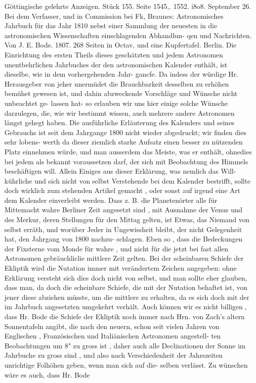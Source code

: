 \documentclass[12pt,a4paper]{article}
\begin{document}
Göttingische  gelehrte  Anzeigen.     Stück  155.     Seite  1545,.  1552.     i8o8.  September  26. Bei  dem  Verfasser,  und  in  Commission  bei  Fk,  Braunes:  Astronomisches  Jahrbuch  für  das  Jahr 1810  nebst  einer  Sammlung  der  neuesten  in  die  astronomischen  Wissenschaften  einschlagenden  Abhandlun- qen  und  Nachrichten.     Von  J.  E.  Bode.  1807.     268  Seiten  in  Octav,  und  eine  Kupfertafel.     Berlin. Die  Einrichtung  des  ersten  Theils  dieses  geschätzten  und  jedem  Astronomen  unentbehrlichen Jahrbuches  der  den  astronomischen  Kalender  enthält,  ist  dieselbe,  wie  in  dem  vorhergehenden  Jahr- gancfe.  Da  indess  der  würdige  Hr.  Herausgeber  von  jeher  unermüdet  die  Brauchbarkeit  desselben  zu erhöhen  bemühet  gewesen  ist,  und  dahin  abzweckende  Vorschläge  und  Wünsche  nicht  unbeachtet  ge- lassen hat-  so  erlauben  wir  uns  hier  einige  solche  Wünsche  darzulegen,  die,  wie  wir  bestimmt  wissen, auch  mehrere  andere  Astronomen  längst  gehegt  haben.  Die  ausführliche  Erläuterung  des  Kalenders und  seines  Gebrauchs  ist  seit  dem  Jahrgange  1800  nicht  wieder  abgedruckt;  wir  finden  dies  sehr  lobens- werth  da  dieser  ziemlich  starke  Aufsatz  einen  besser  zu  nützenden  Platz  einnehmen  würde,  und  man ausserdem  das  Meiste,  was  er  enthält,  ohnedies  bei  jedem  als  bekannt  voraussetzen  darf,  der  sich  mit Beobachtung  des  Himmels  beschäftigen  will.  Allein  Einiges  aus  dieser  Erklärung,  was  nemlich  das  Will- kührliche  und  sich  nicht  von  selbst  Verstehende  bei  dem  Kalender  bestrifft,  sollte  doch  wirklich  zum stehenden  Artikel  gemacht ,  oder  sonst  auf  irgend  eine  Art  dem  Kalender  einverleibt  werden.  Dass z.  B.  die  Planetenörter  alle  für  Mittemacht  wahre  Berliner  Zeit  angesetzt  sind ,  mit  Ausnahme  der  Venus und  des  Merkur,  deren  Stellungen  für  den  Mittag  gelten,  ist  Etwas,  das  Niemand  von  selbst  erräth, und  worüber  Jeder  in  Ungewissheit  bleibt,  der  nicht  Gelegenheit  hat,  den  Jahrgang  von  1800  nachzu- schlagen. Eben  so ,  dass  die  Bedeckungen  der  Fixsterne  vom  Monde  für  wahre ,  und  nicht  für  die  jetzt bei  fast  allen  Astronomen  gebräuchliclie  mittlere  Zeit  gelten.  Bei  der  scheinbaren  Schiefe  der  Ekliptik wird  die  Nutation  immer  mit  verändertem  Zeichen  angegeben:  ohne  Erklärung  versteht  sich  dies  doch nicht  von  selbst,  und  man  sollte  eher  glauben,  dass  man,  da  doch  die  scheinbare  Schiefe,  die  mit  der Nutation  behaftet  ist,  von  jener  diese  abziehen  müsste,  um  die  mittlere  zu  erhalten,  da  es  sich  doch mit  der  im  Jahrbuch  angesetzten  umgekehrt  verhält.  Auch  können  wir  es  nicht  billigen ,  dass  Hr.  Bode die  Schiefe  der  Ekliptik  noch  immer  nach  Hrn.  von  Zach's  altern  Sonnentafeln  angibt,  die  nach  den neuern,  schon  seit  vielen  Jahren  von  Englischen ,  Französischen  und  Italiänischen  Astronomen  angestell- ten Beobachtungen  um  8"  zu  gross  ist ,  daher  auch  alle  Declinationen  der  Sonne  im  Jahrbuche  zu  gross sind ,  und  also  nach  Verschiedenheit  der  Jahrszeiten  unrichtige  Folhöhen  geben,  wenn  man  sich  auf  die- selben verlässt.  Zu  wünschen  wäre  es  auch,  dass  Hr.  Bode  
\end{document}
